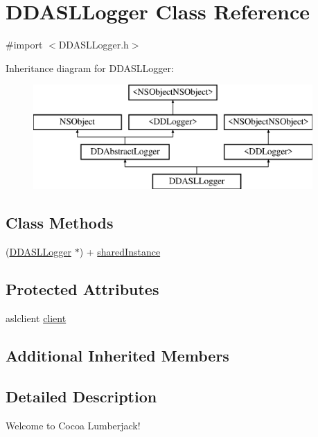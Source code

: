 \hypertarget{interface_d_d_a_s_l_logger}{\section{D\-D\-A\-S\-L\-Logger Class Reference}
\label{interface_d_d_a_s_l_logger}
}


{\ttfamily \#import $<$D\-D\-A\-S\-L\-Logger.\-h$>$}

Inheritance diagram for D\-D\-A\-S\-L\-Logger\-:\begin{figure}[H]
\begin{center}
\leavevmode
\includegraphics[height=4.000000cm]{interface_d_d_a_s_l_logger}
\end{center}
\end{figure}
\subsection*{Class Methods}
\begin{DoxyCompactItemize}
\item 
(\hyperlink{interface_d_d_a_s_l_logger}{D\-D\-A\-S\-L\-Logger} $\ast$) + \hyperlink{interface_d_d_a_s_l_logger_a511d894f0a347f5adfe7dc538fd62ec9}{shared\-Instance}
\end{DoxyCompactItemize}
\subsection*{Protected Attributes}
\begin{DoxyCompactItemize}
\item 
aslclient \hyperlink{interface_d_d_a_s_l_logger_aff7f5e829ed7489ae7d58ff2c8629461}{client}
\end{DoxyCompactItemize}
\subsection*{Additional Inherited Members}


\subsection{Detailed Description}
Welcome to Cocoa Lumberjack!

